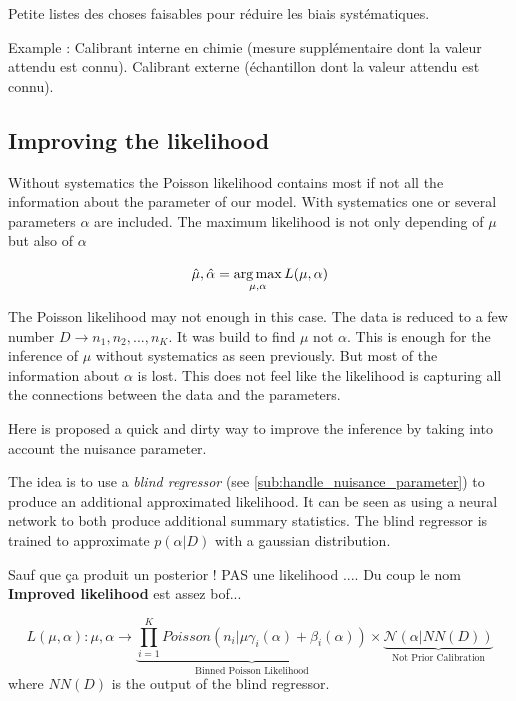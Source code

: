 
Petite listes des choses faisables pour réduire les biais systématiques. 


Example : Calibrant interne en chimie (mesure supplémentaire dont la valeur attendu est connu). Calibrant externe (échantillon dont la valeur attendu est connu).






\subsection{Improving the likelihood} %
\label{sub:improving_the_likelihood}



Without systematics the Poisson likelihood contains most if not all the information about the parameter of our model.
With systematics one or several parameters $\alpha$ are included.
The maximum likelihood is not only depending of $\mu$ but also of $\alpha$

\begin{equation}
	\hat \mu, \hat \alpha = \operatorname*{arg\,max}_{\mu, \alpha} L(\mu, \alpha)
\end{equation}

The Poisson likelihood may not enough in this case.
The data is reduced to a few number $D \to n_1, n_2, ..., n_K$.
It was build to find $\mu$ not $\alpha$.
This is enough for the inference of $\mu$ without systematics as seen previously.
But most of the information about $\alpha$ is lost.
This does not feel like the likelihood is capturing all the connections between the data and the parameters.

Here is proposed a quick and dirty way to improve the inference by taking into account the nuisance parameter.

The idea is to use a \emph{blind regressor} (see \autoref{sub:handle_nuisance_parameter}) to produce an additional approximated likelihood.
It can be seen as using a neural network to both produce additional summary statistics.
The blind regressor is trained to approximate $p(\alpha | D)$ with a gaussian distribution.

Sauf que ça produit un posterior ! PAS une likelihood .... Du coup le nom \textbf{Improved likelihood} est assez bof...

\begin{equation}
	L(\mu, \alpha) : \mu, \alpha 
	\to \underbrace{\prod_{i=1}^K Poisson(n_i | \mu \gamma_i(\alpha) + \beta_i(\alpha))}_{\text{Binned Poisson Likelihood}} 
	\times \underbrace{\mathcal N(\alpha |  NN(D))}_{\text{Not Prior Calibration}}
\end{equation}
where $NN(D)$ is the output of the blind regressor.


